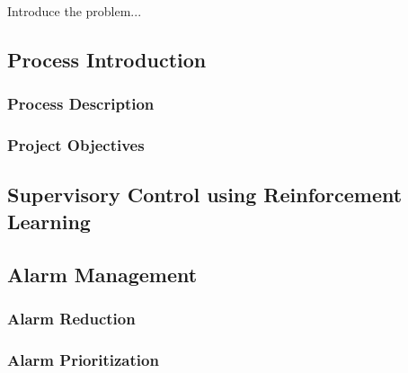 Introduce the problem...

\subsection{Process Introduction}

\subsubsection{Process Description}
\subsubsection{Project Objectives}

\subsection{Supervisory Control using Reinforcement Learning}

\subsection{Alarm Management}

\subsubsection{Alarm Reduction}
\subsubsection{Alarm Prioritization}
